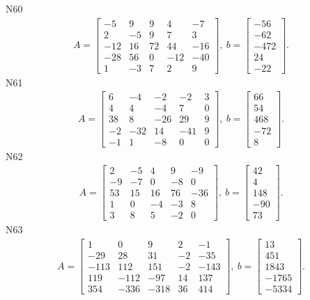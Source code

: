 \documentclass[11pt]{report}
\begin{document}
N60
\begin{align*}
 A = \left[\begin{matrix}-5 & 9 & 9 & 4 & -7\\2 & -5 & 9 & 7 & 3\\-12 & 16 & 72 & 44 & -16\\-28 & 56 & 0 & -12 & -40\\1 & -3 & 7 & 2 & 9\end{matrix}\right],
\ b = \left[\begin{matrix}-56\\-62\\-472\\24\\-22\end{matrix}\right]. 
 \end{align*}
N61
\begin{align*}
 A = \left[\begin{matrix}6 & -4 & -2 & -2 & 3\\4 & 4 & -4 & 7 & 0\\38 & 8 & -26 & 29 & 9\\-2 & -32 & 14 & -41 & 9\\-1 & 1 & -8 & 0 & 0\end{matrix}\right],
\ b = \left[\begin{matrix}66\\54\\468\\-72\\8\end{matrix}\right]. 
 \end{align*}
N62
\begin{align*}
 A = \left[\begin{matrix}2 & -5 & 4 & 9 & -9\\-9 & -7 & 0 & -8 & 0\\53 & 15 & 16 & 76 & -36\\1 & 0 & -4 & -3 & 8\\3 & 8 & 5 & -2 & 0\end{matrix}\right],
\ b = \left[\begin{matrix}42\\4\\148\\-90\\73\end{matrix}\right]. 
 \end{align*}
N63
\begin{align*}
 A = \left[\begin{matrix}1 & 0 & 9 & 2 & -1\\-29 & 28 & 31 & -2 & -35\\-113 & 112 & 151 & -2 & -143\\119 & -112 & -97 & 14 & 137\\354 & -336 & -318 & 36 & 414\end{matrix}\right],
\ b = \left[\begin{matrix}13\\451\\1843\\-1765\\-5334\end{matrix}\right]. 
 \end{align*}
\end{document}
